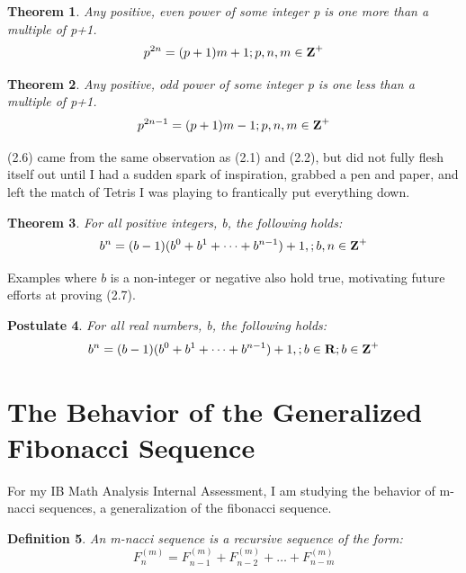 \documentclass{article}
\newtheorem{theorem}{Theorem}[section]
\newtheorem{definition}[theorem]{Definition}
\newtheorem{postulate}[theorem]{Postulate}
\begin{document}
\begin{theorem}
    Any positive, even power of some integer \mbox{p} is one more than a multiple of \mbox{p+1}. 
    $$p^{2n}=(p+1)m+1;p,n,m\in\mbox{\textbf{Z}}^+$$
\end{theorem}

\begin{theorem}
    Any positive, odd power of some integer \mbox{p} is one less than a multiple of \mbox{p+1}. 
    $$p^{2n-1}=(p+1)m-1;p,n,m\in\mbox{\textbf{Z}}^+$$
\end{theorem}

(2.6) came from the same observation as (2.1) and (2.2), but did not fully flesh itself out until I had a sudden spark of inspiration, grabbed a pen and paper, and left the match of Tetris I was playing to frantically put everything down. 

\begin{theorem}
    For all positive integers, b, the following holds:
    $$b^n=(b-1)(b^0+b^1+\dots+b^{n-1})+1,;b,n\in\mbox{\textbf{Z}}^+$$
\end{theorem}

Examples where $b$ is a non-integer or negative also hold true, motivating future efforts at proving (2.7).

\begin{postulate}
    For all real numbers, b, the following holds:
    $$b^n=(b-1)(b^0+b^1+\dots+b^{n-1})+1,;b\in\mbox{\textbf{R}};b\in\mbox{\textbf{Z}}^+$$
\end{postulate}

\section{The Behavior of the Generalized Fibonacci Sequence}

For my IB Math Analysis Internal Assessment, I am studying the behavior of m-nacci sequences, a generalization of the fibonacci sequence.

\begin{definition}
An m-nacci sequence is a recursive sequence of the form:
$$F^{(m)}_n=F^{(m)}_{n-1}+F^{(m)}_{n-2}+\dots+F^{(m)}_{n-m}$$
\end{definition}
\end{document}

